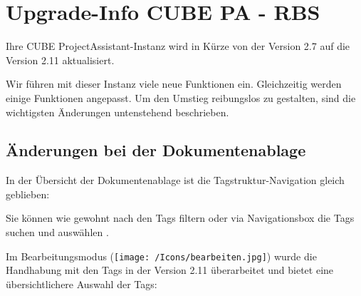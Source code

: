 \section{Upgrade-Info CUBE PA - RBS} %

Ihre CUBE ProjectAssistant-Instanz wird in Kürze von der Version 2.7 auf die Version 2.11 aktualisiert.

\vspace{\baselineskip}

Wir führen mit dieser Instanz viele neue Funktionen ein. Gleichzeitig werden einige Funktionen angepasst. Um den Umstieg reibungslos zu gestalten, sind die wichtigsten Änderungen untenstehend beschrieben.

\subsection{Änderungen bei der Dokumentenablage} %

In der Übersicht der Dokumentenablage ist die Tagstruktur-Navigation gleich geblieben:

\begin{figure}[H]
\end{figure}

Sie können wie gewohnt nach den Tags filtern oder via Navigationsbox die Tags suchen und auswählen .

Im Bearbeitungsmodus (\texttt{[image: /Icons/bearbeiten.jpg]}) wurde die Handhabung mit den Tags in der Version 2.11 überarbeitet und bietet eine übersichtlichere Auswahl der Tags:

\begin{figure}[H]
\end{figure}

